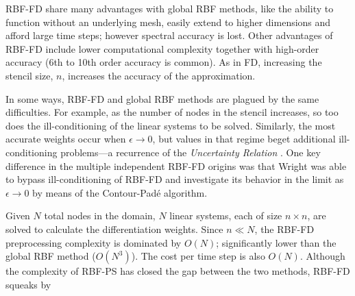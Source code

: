 \documentclass{report}
\begin{document}
{RBF-FD 
share many advantages with global RBF methods, 
like the ability to function without an underlying mesh, easily extend to higher dimensions and afford large time steps; however spectral accuracy is lost. 
Other advantages of RBF-FD 
include lower computational complexity together with high-order accuracy
(6th to 10th order accuracy is common). 
As in FD, increasing the stencil size, $n$, increases the accuracy of the approximation.

In some ways, RBF-FD and global RBF methods are plagued by the same difficulties. For example, as the number of nodes in the stencil increases, so too does the ill-conditioning of the linear systems to be solved. Similarly, the most accurate weights occur when $\epsilon \rightarrow 0$, but values in that regime beget additional ill-conditioning problems---a recurrence of the \emph{Uncertainty Relation} \cite{Schaback1995}. One key difference in the multiple independent RBF-FD origins was that Wright \cite{Wright2003} was able to bypass ill-conditioning of RBF-FD and investigate its behavior in the limit as $\epsilon \rightarrow 0$ by means of the Contour-Pad\'{e} algorithm. 

Given $N$ total nodes in the domain, $N$ linear systems, each of size $n \times n$, are solved to calculate the differentiation weights. Since $n \ll N$, the RBF-FD preprocessing complexity is dominated by $O(N)$; significantly lower than the global RBF method ($O(N^3)$). The cost per time step is also $O(N)$. Although the complexity of RBF-PS has closed the gap between the two methods, RBF-FD squeaks by 

}
\end{document}
